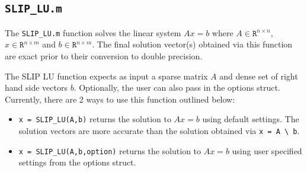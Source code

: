 \documentclass[12pt]{article}
\theoremstyle{definition}
\begin{document}
\cprotect\subsection{\verb|SLIP_LU.m|}
\label{s:Use:MATLAB:factor}

The \verb|SLIP_LU.m| function solves the linear system $A x =
b$ where $A \in \mathtt{R}^{n \times n}$, $x \in
\mathtt{R}^{n \times m}$ and $b \in \mathtt{R}^{n \times m}$. The
final solution vector(s) obtained via this function are exact prior to their
conversion to double precision.

The SLIP LU function expects as input a sparse matrix $A$ and dense set of
right hand side vectors $b$. Optionally, the user can also pass in the
options struct. Currently, there are 2 ways to use this function outlined
below:

\begin{itemize}

\item \verb|x = SLIP_LU(A,b)| returns the solution to $A x =
b$ using default settings. The solution vectors are more accurate than
the solution obtained via \verb|x = A \ b|.

\item \verb|x = SLIP_LU(A,b,option)| returns the solution to $A x =
b$ using user specified settings from the options struct.

\end{itemize}


\newpage


\end{document}
